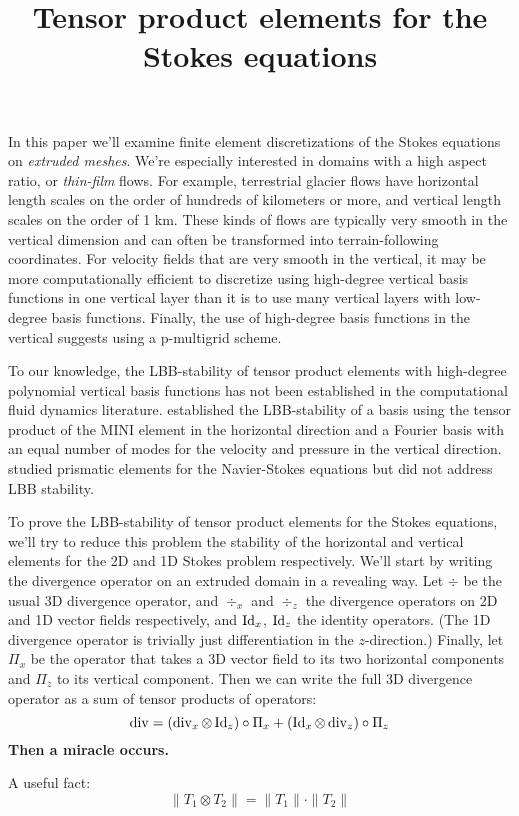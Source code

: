 \documentclass{article}
\title{Tensor product elements for the Stokes equations}
\author{}
\date{}
\theoremstyle{definition}
\theoremstyle{plain}
\renewcommand{\div}[1]{\operatorname{div} #1} %
\newcommand{\Id}[1]{\operatorname{Id} #1}
\begin{document}
\maketitle

In this paper we'll examine finite element discretizations of the Stokes equations on \emph{extruded meshes}.
We're especially interested in domains with a high aspect ratio, or \emph{thin-film} flows.
For example, terrestrial glacier flows have horizontal length scales on the order of hundreds of kilometers or more, and vertical length scales on the order of 1 km.
These kinds of flows are typically very smooth in the vertical dimension and can often be transformed into terrain-following coordinates.
For velocity fields that are very smooth in the vertical, it may be more computationally efficient to discretize using high-degree vertical basis functions in one vertical layer than it is to use many vertical layers with low-degree basis functions.
Finally, the use of high-degree basis functions in the vertical suggests using a p-multigrid scheme.

To our knowledge, the LBB-stability of tensor product elements with high-degree polynomial vertical basis functions has not been established in the computational fluid dynamics literature.
\citet{canuto1984combined} established the LBB-stability of a basis using the tensor product of the MINI element in the horizontal direction and a Fourier basis with an equal number of modes for the velocity and pressure in the vertical direction.
\citet{nakahashi1989finite} studied prismatic elements for the Navier-Stokes equations but did not address LBB stability.

To prove the LBB-stability of tensor product elements for the Stokes equations, we'll try to reduce this problem the stability of the horizontal and vertical elements for the 2D and 1D Stokes problem respectively.
We'll start by writing the divergence operator on an extruded domain in a revealing way.
Let $\div$ be the usual 3D divergence operator, and $\div_x$ and $\div_z$ the divergence operators on 2D and 1D vector fields respectively, and $\Id_x$, $\Id_z$ the identity operators.
(The 1D divergence operator is trivially just differentiation in the $z$-direction.)
Finally, let $\Pi_x$ be the operator that takes a 3D vector field to its two horizontal components and $\Pi_z$ to its vertical component.
Then we can write the full 3D divergence operator as a sum of tensor products of operators:
\begin{equation}
    \div = (\div_x \otimes \Id_z)\circ\Pi_x + (\Id_x \otimes \div_z)\circ\Pi_z
\end{equation}
\textbf{Then a miracle occurs.}

A useful fact:
\begin{equation}
    \|T_1 \otimes T_2\| = \|T_1\|\cdot\|T_2\|
\end{equation}

\pagebreak



\end{document}
